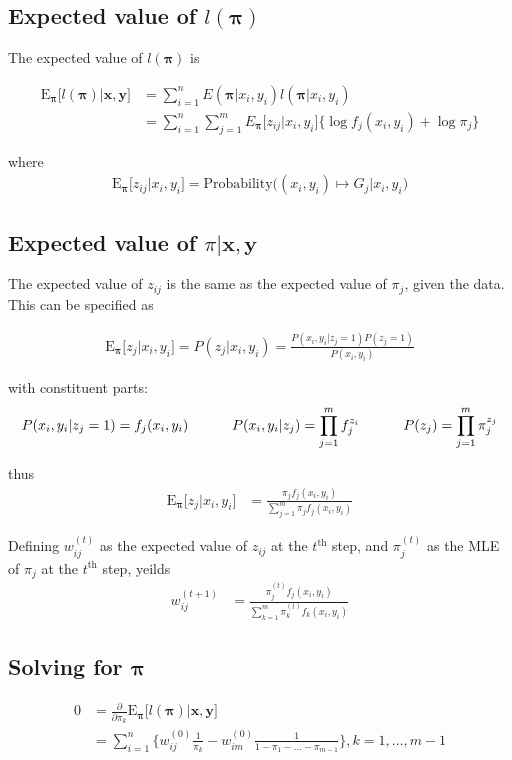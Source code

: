 \documentclass[12pt]{amsart}
\newcommand{\vect}[1]{\boldsymbol{\mathbf{#1}}}
\newcommand{\eqn}[1]{\begin{align*}
#1
\end{align*}}
\newcommand{\shblock}{\hspace{3mm}}
\newcommand{\hblock}{\hspace{8mm}}
\newcommand{\eqnsep}{\shblock\hblock}
\newcommand{\bl}{\big\{}
\newcommand{\br}{\big\}}
\newcommand{\Bl}{\Big\{}
\newcommand{\Br}{\Big\}}
\newcommand{\vx}{\vect{x}}
\newcommand{\vy}{\vect{y}}
\newcommand{\vp}{\vect{\pi}}
\newcommand{\fab}{f_j}
\newcommand{\llp}{l(\vect{\pi})}
\newcommand{\sumn}{\sum^n_{i=1}}
\newcommand{\summ}{\sum^m_{j=1}}
\newcommand{\sumk}{\sum^m_{k=1}}
\begin{document}
\subsection{Expected value of $\llp$}
The expected value of  $\llp$ is

\eqn{
	\text{E}_{\vp}\Big[\llp \big| \vx,\vy \Big] &= \sumn E(\vp | x_i, y_i) l(\vp | x_i, y_i) 		\\
	&= \sumn \summ E_{\vp}\big[z_{ij}|x_i,y_i\big] \bl \log \fab(x_i,y_i) + \log \pi_j  \br
}

where
\eqn{
	\text{E}_{\vp}\Big[  z_{ij} | x_i, y_i \Big] = \text{Probability}\Big((x_i,y_i) \mapsto G_j \big | x_i,y_i\Big)
}








\subsection{Expected value of $\pi|\vect{x},\vect{y}$}
The expected value of $z_{ij}$ is the same as the expected value of $\pi_j$, given the data. This can be specified as

\eqn{
	\text{E}_{\vp}\Big[ z_{j} | x_i,y_i \Big] = P(z_j|x_i,y_i) = \frac{P(x_i,y_i|z_j=1)P(z_j=1)}{P(x_i,y_i)}
}

with constituent parts:
\eqn{
	P(x_i,y_i | z_j=1) = f_j(x_i,y_i) \eqnsep  P(x_i,y_i|z_j) = \prod^m_{j=1}f_j^{z_i}	 \eqnsep  P(z_j) = \prod^m_{j=1} \pi_j^{z_j}
}

thus
\eqn{
	\text{E}_{\vp}\Big[ z_{j} | x_i,y_i \Big] &=  \frac{\pi_j \fab(x_i,y_i)}{\summ \pi_j \fab(x_i,y_i)}
}


Defining $w^{(t)}_{ij}$ as the expected value of $z_{ij}$ at the $t^\text{th}$ step, and $\pi^{(t)}_j$ as the MLE of $\pi_j$  at the $t^\text{th}$ step, yeilds
\eqn{
	w^{(t+1)}_{ij} &= \frac{\pi^{(t)}_{j} \fab(x_i,y_i)}{\sumk \pi^{(t)}_{k}f_k(x_i,y_i)}
}







\subsection{Solving for $\vp$}
\eqn{
	0 &= \frac{\partial}{\partial \pi_k} \text{E}_{\vect{\pi}}\Big[\llp \big| \vect{x},\vect{y}\Big]    \\
	& =      \sumn \Bl  w^{(0)}_{ij} \frac{1}{\pi_k} - w^{(0)}_{im} \frac{1}{1-\pi_1-\ldots-\pi_{m-1}}   \Br, k=1,\ldots,m-1
}
\end{document}
